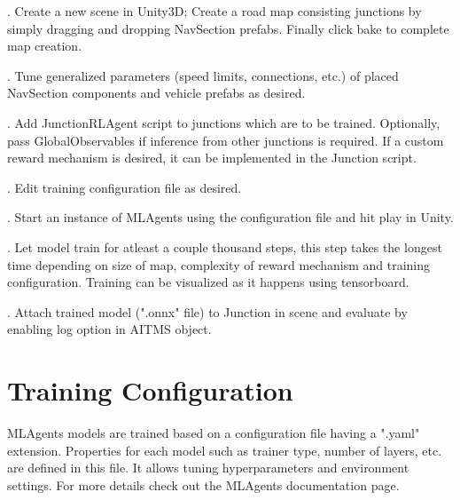 \documentclass[openany,12pt]{report}
\begin{document}
		\begin{minipage}[t]{0.05\textwidth} 

		\end{minipage}
		\hfill
		\begin{minipage}[t]{0.95\textwidth} 
		
			\addtocounter{number}{1}
			\thenumber . Create a new scene in Unity3D; Create a road map consisting junctions by simply dragging and dropping NavSection prefabs. Finally click bake to complete map creation.\\
			\addtocounter{number}{1}
			\thenumber . Tune generalized parameters (speed limits, connections, etc.) of placed NavSection components and vehicle prefabs as desired.\\
			\addtocounter{number}{1}
			\thenumber . Add JunctionRLAgent script to junctions which are to be trained. Optionally, pass GlobalObservables if inference from other junctions is required. If a custom reward mechanism is desired, it can be implemented in the Junction script.\\
			\addtocounter{number}{1}
			\thenumber . Edit training configuration file as desired.\\
			\addtocounter{number}{1}
			\thenumber . Start an instance of MLAgents using the configuration file and hit play in Unity.\\
			\addtocounter{number}{1}
			\thenumber . Let model train for atleast a couple thousand steps, this step takes the longest time depending on size of map, complexity of reward mechanism and training configuration. Training can be visualized as it happens using tensorboard.\\
			\addtocounter{number}{1}
			\thenumber . Attach trained model (".onnx" file) to Junction in scene and evaluate by enabling log option in AITMS object.\\
			\end{minipage}
		\section{Training Configuration}
		\hspace*{0.5 in}MLAgents models are trained based on a configuration file having a ".yaml" extension. Properties for each model such as trainer type, number of layers, etc. are defined in this file. 
		It allows tuning hyperparameters and environment settings. For more details check out the MLAgents documentation page.
		
		\newpage
\end{document}
